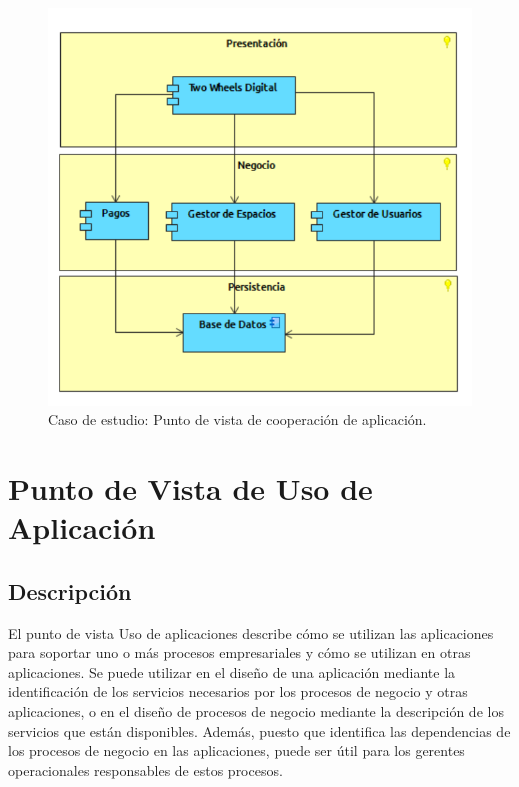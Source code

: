 \begin{figure}[H]
	\centering
	\includegraphics[width=1.0\textwidth]{imagenes/Caso_Estudio/Aplicacion/CoopAplicacion.PDF}
	\caption{Caso de estudio: Punto de vista de cooperación de aplicación.}
	\label{fig:gap_analysis}
\end{figure}






\section{Punto de Vista de Uso de Aplicación}
\subsection{Descripción}
El punto de vista Uso de aplicaciones describe cómo se utilizan las aplicaciones para soportar uno o más procesos empresariales y cómo se utilizan en otras aplicaciones. Se puede utilizar en el diseño de una aplicación mediante la identificación de los servicios necesarios por los procesos de negocio y otras aplicaciones, o en el diseño de procesos de negocio mediante la descripción de los servicios que están disponibles. Además, puesto que identifica las dependencias de los procesos de negocio en las aplicaciones, puede ser útil para los gerentes operacionales responsables de estos procesos.

